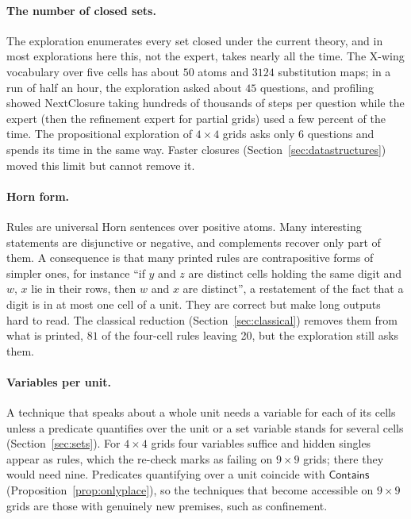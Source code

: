 \documentclass[11pt,a4paper]{article}
\theoremstyle{definition}
\theoremstyle{remark}
\newcommand{\pred}[1]{\mathsf{#1}}
\newcommand{\Contains}{\pred{Contains}}
\begin{document}
\paragraph{The number of closed sets.}
The exploration enumerates every set closed under the current theory, and in most explorations here this, not the expert, takes nearly all the time. The X-wing vocabulary over five cells has about $50$ atoms and $3124$ substitution maps; in a run of half an hour, the exploration asked about $45$ questions, and profiling showed NextClosure taking hundreds of thousands of steps per question while the expert (then the refinement expert for partial grids) used a few percent of the time. The propositional exploration of $4 \times 4$ grids asks only $6$ questions and spends its time in the same way. Faster closures (Section~\ref{sec:datastructures}) moved this limit but cannot remove it.

\paragraph{Horn form.}
Rules are universal Horn sentences over positive atoms. Many interesting statements are disjunctive or negative, and complements recover only part of them. A consequence is that many printed rules are contrapositive forms of simpler ones, for instance ``if $y$ and $z$ are distinct cells holding the same digit and $w$, $x$ lie in their rows, then $w$ and $x$ are distinct'', a restatement of the fact that a digit is in at most one cell of a unit. They are correct but make long outputs hard to read. The classical reduction (Section~\ref{sec:classical}) removes them from what is printed, $81$ of the four-cell rules leaving 20, but the exploration still asks them.

\paragraph{Variables per unit.}
A technique that speaks about a whole unit needs a variable for each of its cells unless a predicate quantifies over the unit or a set variable stands for several cells (Section~\ref{sec:sets}). For $4 \times 4$ grids four variables suffice and hidden singles appear as rules, which the re-check marks as failing on $9 \times 9$ grids; there they would need nine. Predicates quantifying over a unit coincide with $\Contains$ (Proposition~\ref{prop:onlyplace}), so the techniques that become accessible on $9 \times 9$ grids are those with genuinely new premises, such as confinement.
\end{document}
